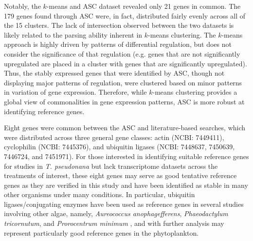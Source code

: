 	Notably, the $k$-means and ASC dataset revealed only 21 genes in common. The 179 genes found through ASC were, in fact, distributed fairly evenly across all of the 15 clusters. The lack of intersection observed between the two datasets is likely related to the parsing ability inherent in $k$-means clustering. The $k$-means approach is highly driven by patterns of differential regulation, but does not consider the significance of that regulation (e.g. genes that are not significantly upregulated are placed in a cluster with genes that are significantly upregulated). Thus, the stably expressed genes that were identified by ASC, though not displaying major patterns of regulation, were clustered based on minor patterns in variation of gene expression. Therefore, while $k$-means clustering provides a global view of commonalities in gene expression patterns, ASC is more robust at identifying reference genes.\par
	Eight genes were common between the ASC and literature-based searches, which were distributed across three general gene classes: actin (NCBI: 7449411), cyclophilin (NCBI: 7445376), and ubiquitin ligases (NCBI: 7448637, 7450639, 7446724, and 7451971). For those interested in identifying suitable reference genes for studies in \textit{T. pseudonana} but lack transcriptome datasets across the treatments of interest, these eight genes may serve as good tentative reference genes as they are verified in this study and have been identified as stable in many other organisms under many conditions. In particular, ubiquitin ligases/conjugating enzymes have been used as reference genes in several studies involving other algae, namely, \textit{Aureococcus anophagefferens}, \textit{Phaeodactylum tricornutum}, and \textit{Prorocentrum minimum} \citep{Siaut2007, McGinn2008, Guo2012, Wurch2011, Berg2008}, and with further analysis may represent particularly good reference genes in the phytoplankton. \par
